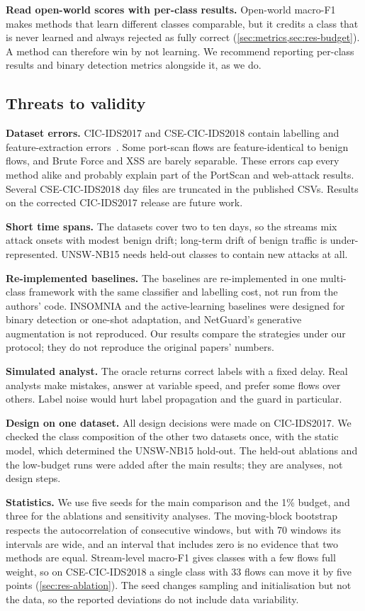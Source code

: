 \textbf{Read open-world scores with per-class results.} Open-world macro-F1 makes methods that learn different
classes comparable, but it credits a class that is never learned and always rejected as fully correct
(\cref{sec:metrics,sec:res-budget}). A method can therefore win by not learning. We recommend reporting
per-class results and binary detection metrics alongside it, as we do.

\subsection{Threats to validity}
\textbf{Dataset errors.} CIC-IDS2017 and CSE-CIC-IDS2018 contain labelling and feature-extraction
errors~\cite{engelen2021troubleshooting,lanvin2022errors,liu2022error}. Some port-scan flows are feature-identical to
benign flows, and Brute Force and XSS are barely separable. These errors cap every method alike and probably explain
part of the PortScan and web-attack results. Several CSE-CIC-IDS2018 day files are truncated in the published CSVs.
Results on the corrected CIC-IDS2017 release are future work.

\textbf{Short time spans.} The datasets cover two to ten days, so the streams mix attack onsets with modest benign
drift; long-term drift of benign traffic is under-represented. UNSW-NB15 needs held-out classes to contain new
attacks at all.

\textbf{Re-implemented baselines.} The baselines are re-implemented in one multi-class framework with the same
classifier and labelling cost, not run from the authors' code. INSOMNIA and the active-learning baselines were
designed for binary detection or one-shot adaptation, and NetGuard's generative augmentation is not reproduced. Our
results compare the strategies under our protocol; they do not reproduce the original papers' numbers.

\textbf{Simulated analyst.} The oracle returns correct labels with a fixed delay. Real analysts make mistakes,
answer at variable speed, and prefer some flows over others. Label noise would hurt label propagation and the
guard in particular.

\textbf{Design on one dataset.} All design decisions were made on CIC-IDS2017. We checked the class composition of
the other two datasets once, with the static model, which determined the UNSW-NB15 hold-out. The held-out ablations
and the low-budget runs were added after the main results; they are analyses, not design steps.

\textbf{Statistics.} We use five seeds for the main comparison and the 1\% budget, and three for the ablations and
sensitivity analyses. The moving-block bootstrap respects the autocorrelation of consecutive windows, but with 70
windows its intervals are wide, and an interval that includes zero is no evidence that two methods are equal.
Stream-level macro-F1 gives classes with a few flows full weight, so on CSE-CIC-IDS2018 a single class with 33 flows
can move it by five points (\cref{sec:res-ablation}). The seed changes sampling and initialisation but not the
data, so the reported deviations do not include data variability.
